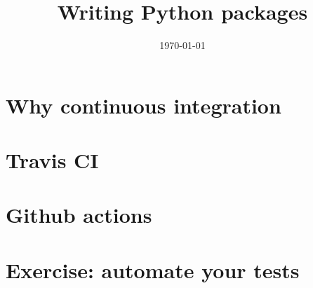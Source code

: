 \documentclass[10pt]{beamer}
\title{Writing Python packages}
\date[]{\today}
\begin{document}
\begin{frame}
  \titlepage
\end{frame}


\section{Why continuous integration}


\section{Travis CI}


\section{Github actions}


\section{Exercise: automate your tests}
\end{document}
